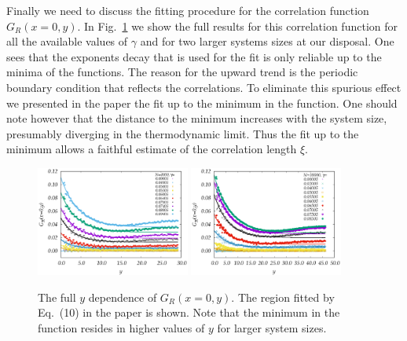 \documentclass[aps,pnas,float]{revtex4}
\begin{document}
Finally we need to discuss the fitting procedure for the correlation function $G_R(x=0,y)$. In Fig.~\ref{full}
we show the full results for this correlation function for all the available values of $\gamma$ and for two larger systems sizes at our disposal. One sees that the exponents decay that is used for the fit is only
reliable up to the minima of the functions. The reason for the upward trend is the periodic boundary condition that reflects the correlations. To eliminate this spurious effect we presented in the paper the fit
up to the minimum in the function. One should note however that the distance to the minimum increases
with the system size, presumably diverging in the thermodynamic limit. Thus the fit up to the minimum
allows a faithful estimate of the correlation length $\xi$.
\begin{figure}[htb]
 \includegraphics[width=0.45\textwidth]{spinodalSIFig4a.eps}
 \includegraphics[width=0.45\textwidth]{spinodalSIFig4b.eps}
\caption{The full $y$ dependence of $G_R(x=0,y)$. The region fitted by Eq.~(10) in the paper
is shown. Note that the minimum in the function resides in higher values of $y$ for larger
system sizes.}
\label{full}
\end{figure}


%
\end{document}
